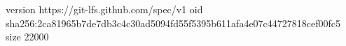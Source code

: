 version https://git-lfs.github.com/spec/v1
oid sha256:2ca81965b7de7db3c4c30ad5094fd55f5395b611afa4e07c44727818cef00fc5
size 22000
